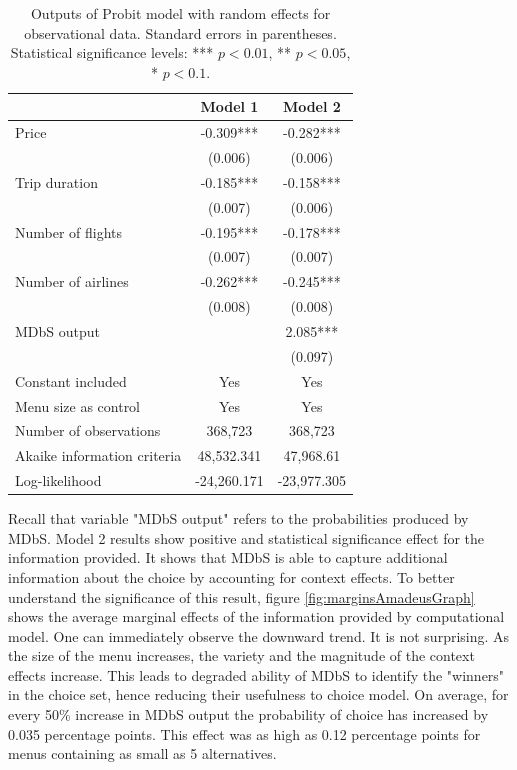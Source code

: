 \documentclass[a4paper,12pt]{article}
\begin{document}
\begin{table}
    \centering

    \begin{tabular}{lcc}
    \hline
     & Model 1 & Model 2 \\
    \hline
    Price & -0.309*** & -0.282*** \\
     & (0.006) & (0.006) \\[1ex]
    Trip duration & -0.185*** & -0.158*** \\
     & (0.007) & (0.006) \\[1ex]
    Number of flights & -0.195*** & -0.178*** \\
     & (0.007) & (0.007) \\[1ex]
    Number of airlines & -0.262*** & -0.245*** \\
     & (0.008) & (0.008) \\[1ex]
    MDbS output & & 2.085*** \\
     & & (0.097) \\[1ex]
    Constant included & Yes & Yes \\[1ex]
    Menu size as control & Yes & Yes \\[1ex]
    Number of observations & 368,723 & 368,723 \\[1ex]
    Akaike information criteria & 48,532.341 & 47,968.61 \\[1ex]
    Log-likelihood & -24,260.171 & -23,977.305 \\[1ex]
    \hline
    \end{tabular}
    \caption{Outputs of Probit model with random effects for observational data. Standard errors in parentheses. Statistical significance levels: *** $p<0.01$, ** $p<0.05$, * $p<0.1.$}
    \label{tab:amadeusProbitResults}
\end{table}

Recall that variable "MDbS output" refers to the probabilities produced by MDbS. Model 2 results show positive and statistical significance effect for the information provided. It shows that MDbS is able to capture additional information about the choice by accounting for context effects. To better understand the significance of this result, figure \ref{fig:marginsAmadeusGraph} shows the average marginal effects of the information provided by computational model. One can immediately observe the downward trend. It is not surprising. As the size of the menu increases, the variety and the magnitude of the context effects increase. This leads to degraded ability of MDbS to identify the "winners" in the choice set, hence reducing their usefulness to choice model. On average, for every 50\% increase in MDbS output the probability of choice has increased by 0.035 percentage points. This effect was as high as 0.12 percentage points for menus containing as small as 5 alternatives. 
\end{document}
